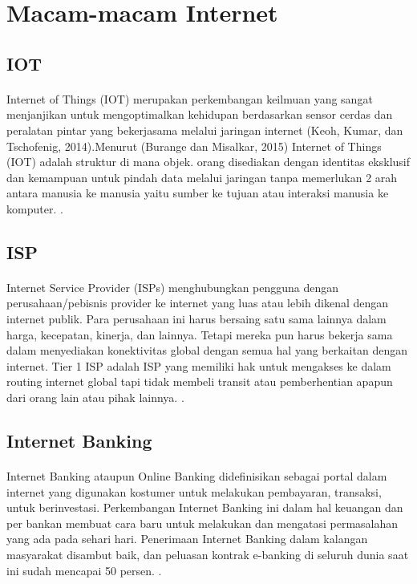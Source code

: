 \section{Macam-macam Internet}
\subsection{IOT}
\paragraph{} Internet of Things (IOT) merupakan perkembangan keilmuan yang sangat menjanjikan untuk mengoptimalkan kehidupan berdasarkan sensor cerdas dan peralatan pintar yang bekerjasama melalui jaringan internet (Keoh, Kumar, dan Tschofenig, 2014).Menurut (Burange dan Misalkar, 2015) Internet of Things (IOT) adalah struktur di mana objek. orang disediakan dengan identitas eksklusif dan kemampuan untuk pindah data melalui jaringan tanpa memerlukan 2 arah antara manusia ke manusia yaitu sumber ke tujuan atau interaksi manusia ke komputer.
\cite{junaidi2015internet}.
\subsection{ISP}
\paragraph{} Internet Service Provider (ISPs) menghubungkan pengguna dengan perusahaan/pebisnis provider ke internet yang luas atau lebih dikenal dengan internet publik. Para perusahaan ini harus bersaing satu sama lainnya dalam harga, kecepatan, kinerja, dan lainnya. Tetapi mereka pun harus bekerja sama dalam menyediakan konektivitas global dengan semua hal yang berkaitan dengan internet. Tier 1 ISP adalah ISP yang memiliki hak untuk mengakses ke dalam routing internet global tapi tidak membeli transit atau pemberhentian apapun dari orang lain atau pihak lainnya.
\cite{norton2001internet}.
\subsection{Internet Banking}
\paragraph{} Internet Banking ataupun Online Banking didefinisikan sebagai portal dalam internet yang digunakan kostumer untuk melakukan pembayaran, transaksi, untuk berinvestasi. Perkembangan Internet Banking ini dalam hal keuangan dan per bankan membuat cara baru untuk melakukan dan mengatasi permasalahan yang ada pada sehari hari. Penerimaan Internet Banking dalam kalangan masyarakat disambut baik, dan peluasan kontrak e-banking di seluruh dunia saat ini sudah mencapai 50 persen.
\cite{pikkarainen2004consumer}.
